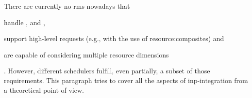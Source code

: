 There are currently no \glspl{rm} nowadays that
\begin{mylist}
    \item handle ,  and ,
    \item support high-level requests (e.g., with the use of \glspl{resource:composite}) and
    \item are capable of considering multiple resource dimensions
\end{mylist}.
However, different schedulers fulfill, even partially, a subset of those requirements.
This paragraph tries to cover all the aspects of \gls{inp}-integration from a theoretical point of view.